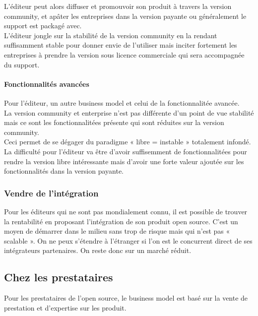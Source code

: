 			L'éditeur peut alors diffuser et promouvoir son produit à travers la version community, et apâter les entreprises dans la version payante ou généralement le support est packagé avec.\\

			L'éditeur jongle sur la stabilité de la version community en la rendant suffisamment stable pour donner envie de l'utiliser mais inciter fortement les entreprises à prendre la version sous licence commerciale qui sera accompagnée du support.

			\paragraph{Fonctionnalités avancées\\}

			Pour l'éditeur, un autre business model et celui de la fonctionnalitée avancée.\\
			La version community et enterprise n'est pas différente d'un point de vue stabilité mais ce sont les fonctionnalitées présente qui sont réduites sur la version community.\\

			Ceci permet de se dégager du paradigme « libre = instable » totalement infondé.\\

			La difficulté pour l'éditeur va être d'avoir suffisemment de fonctionnalitées pour rendre la version libre intéressante mais d'avoir une forte valeur ajoutée sur les fonctionnalités dans la version payante.

		\subsubsection{Vendre de l'intégration}

		Pour les éditeurs qui ne sont pas mondialement connu, il est possible de trouver la rentabilité en proposant l'intégration de son produit open source. C'est un moyen de démarrer dans le milieu sans trop de risque mais qui n'est pas « \gls{scalable} ». On ne peux s'étendre à l'étranger si l'on est le concurrent direct de ses intégrateurs partenaires. On reste donc sur un marché réduit.
			
		\subsection{Chez les prestataires}

			Pour les prestataires de l'open source, le business model est basé sur la vente de prestation et d'expertise sur les produit.

